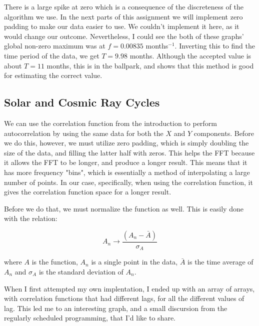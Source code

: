 \documentclass[12pt]{article}
\begin{document}
There is a large spike at zero which is a consequence of the discreteness of the algorithm we use. In the next parts of this assignment we will implement zero padding to make our data easier to use. We couldn't implement it here, as it would change our outcome. Nevertheless, I could see the both of these graphs' global non-zero maximum was at $f=0.00835$ months$^{-1}$. Inverting this to find the time period of the data, we get $T = 9.98$ months. Although the accepted value is about $T=11$ months, this is in the ballpark, and shows that this method is good for estimating the correct value.




\subsection*{Solar and Cosmic Ray Cycles}


We can use the correlation function from the introduction to perform autocorrelation by using the same data for both the $X$ and $Y$ components. Before we do this, however, we must utilize zero padding, which is simply doubling the size of the data, and filling the latter half with zeros. This helps the FFT because it allows the FFT to be longer, and produce a longer result. This means that it has more frequency "bins", which is essentially a method of interpolating a large number of points. In our case, specifically, when using the correlation function, it gives the correlation function space for a longer result.

Before we do that, we must normalize the function as well. This is easily done with the relation:

\begin{equation}
A_n \longrightarrow \frac{( A_n - \bar{A} )}{\sigma_A} 
\end{equation}

where $A$ is the function, $A_n$ is a single point in the data, $\bar{A}$ is the time average of $A_n$ and $\sigma_A$ is the standard deviation of $A_n$. 

When I first attempted my own implentation, I ended up with an array of arrays, with correlation functions that had different lags, for all the different values of lag. This led me to an interesting graph, and a small discursion from the regularly scheduled programming, that I'd like to share.
\end{document}
